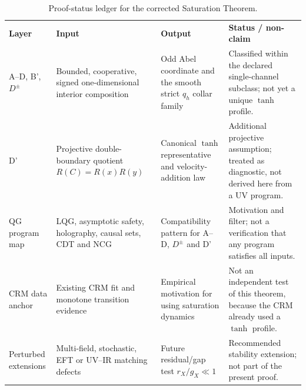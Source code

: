 \documentclass[aps,prd,twocolumn,superscriptaddress,nofootinbib]{revtex4-2}
\begin{document}
\begin{table}[t]
\caption{Proof-status ledger for the corrected Saturation Theorem.}
\label{tab:proof_status_ledger}
\small
\begin{ruledtabular}
\begin{tabular}{@{}llll@{}}
\parbox[t]{0.14\textwidth}{\textbf{Layer}} & \parbox[t]{0.24\textwidth}{\textbf{Input}} & \parbox[t]{0.22\textwidth}{\textbf{Output}} & \parbox[t]{0.27\textwidth}{\textbf{Status / non-claim}} \\
\parbox[t]{0.14\textwidth}{A--D, B', $D^\pm$} & \parbox[t]{0.24\textwidth}{Bounded, cooperative, signed one-dimensional interior composition} & \parbox[t]{0.22\textwidth}{Odd Abel coordinate and the smooth strict $q_h$ collar family} & \parbox[t]{0.27\textwidth}{Classified within the declared single-channel subclass; not yet a unique $\tanh$ profile.} \\[0.6em]
\parbox[t]{0.14\textwidth}{D'} & \parbox[t]{0.24\textwidth}{Projective double-boundary quotient $R(C)=R(x)R(y)$} & \parbox[t]{0.22\textwidth}{Canonical $\tanh$ representative and velocity-addition law} & \parbox[t]{0.27\textwidth}{Additional projective assumption; treated as diagnostic, not derived here from a UV program.} \\[0.6em]
\parbox[t]{0.14\textwidth}{QG program map} & \parbox[t]{0.24\textwidth}{LQG, asymptotic safety, holography, causal sets, CDT and NCG} & \parbox[t]{0.22\textwidth}{Compatibility pattern for A--D, $D^\pm$ and D'} & \parbox[t]{0.27\textwidth}{Motivation and filter; not a verification that any program satisfies all inputs.} \\[0.6em]
\parbox[t]{0.14\textwidth}{CRM data anchor} & \parbox[t]{0.24\textwidth}{Existing CRM fit and monotone transition evidence} & \parbox[t]{0.22\textwidth}{Empirical motivation for using saturation dynamics} & \parbox[t]{0.27\textwidth}{Not an independent test of this theorem, because the CRM already used a $\tanh$ profile.} \\[0.6em]
\parbox[t]{0.14\textwidth}{Perturbed extensions} & \parbox[t]{0.24\textwidth}{Multi-field, stochastic, EFT or UV--IR matching defects} & \parbox[t]{0.22\textwidth}{Future residual/gap test $r_X/g_X \ll 1$} & \parbox[t]{0.27\textwidth}{Recommended stability extension; not part of the present proof.} \\
\end{tabular}
\end{ruledtabular}
\end{table}
\end{document}

